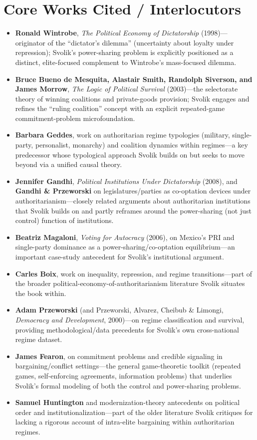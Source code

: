 \documentclass[12pt]{article}
\begin{document}
\section{Core Works Cited / Interlocutors}

\begin{itemize}[leftmargin=*, itemsep=4pt]
    \item \textbf{Ronald Wintrobe}, \textit{The Political Economy of Dictatorship} (1998)---originator of the ``dictator's dilemma'' (uncertainty about loyalty under repression); Svolik's power-sharing problem is explicitly positioned as a distinct, elite-focused complement to Wintrobe's mass-focused dilemma.
    \item \textbf{Bruce Bueno de Mesquita, Alastair Smith, Randolph Siverson, and James Morrow}, \textit{The Logic of Political Survival} (2003)---the selectorate theory of winning coalitions and private-goods provision; Svolik engages and refines the ``ruling coalition'' concept with an explicit repeated-game commitment-problem microfoundation.
    \item \textbf{Barbara Geddes}, work on authoritarian regime typologies (military, single-party, personalist, monarchy) and coalition dynamics within regimes---a key predecessor whose typological approach Svolik builds on but seeks to move beyond via a unified causal theory.
    \item \textbf{Jennifer Gandhi}, \textit{Political Institutions Under Dictatorship} (2008), and \textbf{Gandhi \& Przeworski} on legislatures/parties as co-optation devices under authoritarianism---closely related arguments about authoritarian institutions that Svolik builds on and partly reframes around the power-sharing (not just control) function of institutions.
    \item \textbf{Beatriz Magaloni}, \textit{Voting for Autocracy} (2006), on Mexico's PRI and single-party dominance as a power-sharing/co-optation equilibrium---an important case-study antecedent for Svolik's institutional argument.
    \item \textbf{Carles Boix}, work on inequality, repression, and regime transitions---part of the broader political-economy-of-authoritarianism literature Svolik situates the book within.
    \item \textbf{Adam Przeworski} (and Przeworski, Alvarez, Cheibub \& Limongi, \textit{Democracy and Development}, 2000)---on regime classification and survival, providing methodological/data precedents for Svolik's own cross-national regime dataset.
    \item \textbf{James Fearon}, on commitment problems and credible signaling in bargaining/conflict settings---the general game-theoretic toolkit (repeated games, self-enforcing agreements, information problems) that underlies Svolik's formal modeling of both the control and power-sharing problems.
    \item \textbf{Samuel Huntington} and modernization-theory antecedents on political order and institutionalization---part of the older literature Svolik critiques for lacking a rigorous account of intra-elite bargaining within authoritarian regimes.
\end{itemize}
\end{document}
